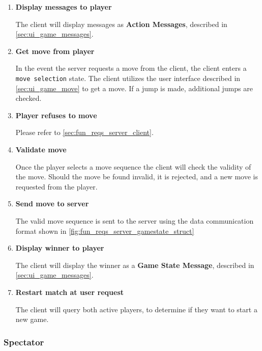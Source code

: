 \documentclass[letterpaper]{article}
\begin{document}
\begin{enumerate}
    \item \textbf{Display messages to player}
          
          The client will display messages as
          \textbf{Action Messages}, described in
          \cref{sec:ui_game_messages}.
          
    \item \textbf{Get move from player}
          
          In the event the server requests a move from the
          client, the client enters a \texttt{move selection}
          state. The client utilizes the user interface
          described in \cref{sec:ui_game_move} to get a
          move. If a jump is made, additional jumps are
          checked.
          
    \item \textbf{Player refuses to move}
          
          Please refer to \cref{sec:fun_reqs_server_client}.
          
    \item \textbf{Validate move}
          
          Once the player selects a move sequence the client
          will check the validity of the move. Should the
          move be found invalid, it is rejected, and a new
          move is requested from the player.
          
    \item \textbf{Send move to server}
          
          The valid move sequence is sent to the server
          using the data communication format shown in
          \cref{fig:fun_reqs_server_gamestate_struct}
          
    \item \textbf{Display winner to player}
          
          The client will display the winner as a
          \textbf{Game State Message}, described in
          \cref{sec:ui_game_messages}.
          
    \item \textbf{Restart match at user request}
          
          The client will query both active players, to
          determine if they want to start a new game.
          
\end{enumerate}

\subsubsection{Spectator}
\label{sec:fun_reqs_client_spectator}
\end{document}
